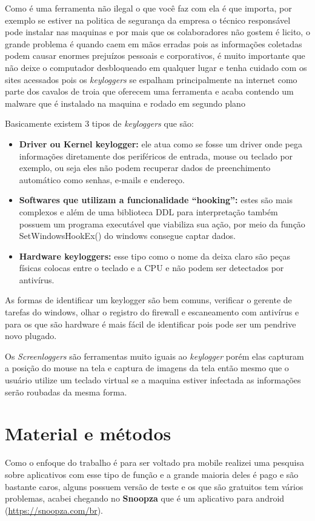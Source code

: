 \documentclass[12pt]{article}
\begin{document}
Como é uma ferramenta não ilegal o que você faz com ela é que importa, por exemplo se estiver na politica de segurança da empresa o técnico responsável pode instalar nas maquinas e por mais que os colaboradores não gostem é licito, o grande problema é quando caem em mãos erradas pois as informações coletadas podem causar enormes prejuízos pessoais e corporativos, é muito importante que não deixe o computador desbloqueado em qualquer lugar e tenha cuidado com os sites acessados pois os \textit{keyloggers} se espalham principalmente na internet como parte dos cavalos de troia que oferecem uma ferramenta e acaba contendo um malware que é instalado na maquina e rodado em segundo plano

Basicamente existem 3 tipos de \textit{keyloggers} que são:

\begin{itemize}
  \item \textbf{Driver ou Kernel keylogger:} ele atua como se fosse um driver onde pega informações diretamente dos periféricos de entrada, mouse ou teclado por exemplo, ou seja eles não podem recuperar dados de preenchimento automático como senhas, e-mails e endereço. 
  \item \textbf{Softwares que utilizam a funcionalidade “hooking”:} estes são mais complexos e além de uma biblioteca DDL para interpretação também possuem um programa executável que viabiliza sua ação, por meio da função SetWindowsHookEx() do windows consegue captar dados.
  \item \textbf{Hardware keyloggers:} esse tipo como o nome da deixa claro são peças físicas colocas entre o teclado e a CPU e não podem ser detectados por antivírus. 
\end{itemize}

As formas de identificar um keylogger são bem comuns, verificar o gerente de tarefas do windows, olhar o registro do firewall e escaneamento com antivírus e para os que são hardware é mais fácil de identificar pois pode ser um pendrive novo plugado.

Os \textit{Screenloggers} são ferramentas muito iguais ao \textit{keylogger} porém elas capturam a posição do mouse na tela e captura de imagens da tela então mesmo que o usuário utilize um teclado virtual se a maquina estiver infectada as informações serão roubadas da mesma forma.

\section{Material e métodos} \label{sec:firstpage}
Como o enfoque do trabalho é para ser voltado pra mobile realizei uma pesquisa sobre aplicativos com esse tipo de função e a grande maioria deles é pago e são bastante caros, alguns possuem versão de teste e os que são gratuitos tem vários problemas, acabei chegando no \textbf{Snoopza} que é um aplicativo para android (\url{https://snoopza.com/br}). 
\end{document}
